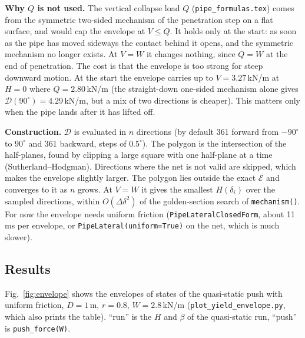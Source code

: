 \documentclass[11pt,a4paper]{article}
\begin{document}
\textbf{Why $Q$ is not used.}  The vertical collapse load $Q$
(\texttt{pipe\_formulas.tex}) comes from the symmetric two-sided
mechanism of the penetration step on a flat surface, and would cap the
envelope at $V \le Q$.  It holds only at the start: as soon as the pipe
has moved sideways the contact behind it opens, and the symmetric
mechanism no longer exists.  At $V = W$ it changes nothing, since
$Q = W$ at the end of penetration.  The cost is that the envelope is
too strong for steep downward motion.  At the start the envelope
carries up to $V = 3.27$\,kN/m at $H = 0$ where $Q = 2.80$\,kN/m (the
straight-down one-sided mechanism alone gives
$\mathcal{D}(90^\circ) = 4.29$\,kN/m, but a mix of two directions is
cheaper).  This matters only when the pipe lands after it has lifted
off.

\textbf{Construction.}  $\mathcal{D}$ is evaluated in $n$ directions
(by default 361 forward from $-90^\circ$ to $90^\circ$ and 361 backward,
steps of $0.5^\circ$).  The polygon is the intersection of the
half-planes, found by clipping a large square with one half-plane at a
time (Sutherland--Hodgman).  Directions where the net is not valid are
skipped, which makes the envelope slightly larger.  The polygon lies
outside the exact $\mathcal{E}$ and converges to it as $n$ grows.  At
$V = W$ it gives the smallest $H(\delta_i)$ over the sampled
directions, within $O(\Delta\delta^2)$ of the golden-section search of
\texttt{mechanism()}.  For now the envelope needs uniform friction
(\texttt{PipeLateralClosedForm}, about 11\,ms per envelope, or
\texttt{PipeLateral(uniform=True)} on the net, which is much slower).

\subsection{Results}
\label{sec:envelope_results}

Fig.~\ref{fig:envelope} shows the envelopes of states of the
quasi-static push with uniform friction, $D = 1$\,m, $r = 0.8$,
$W = 2.8$\,kN/m (\texttt{plot\_yield\_envelope.py}, which also prints
the table).  ``run'' is the $H$ and $\beta$ of the quasi-static run,
``push'' is \texttt{push\_force(W)}.
\end{document}
